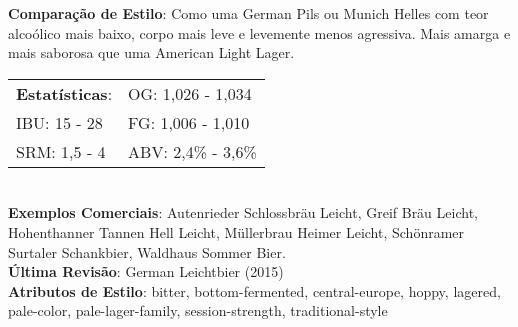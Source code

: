 \textbf{Comparação de Estilo}: Como uma German Pils ou Munich Helles com teor alcoólico mais baixo, corpo mais leve e levemente menos agressiva. Mais amarga e mais saborosa que uma American Light Lager. \\
\begin{tabular}{@{}p{35mm}p{35mm}@{}}
  \textbf{Estatísticas}: & OG: 1,026 - 1,034 \\
  IBU: 15 - 28  & FG: 1,006 - 1,010  \\
  SRM: 1,5 - 4  & ABV: 2,4\% - 3,6\%
\end{tabular}\\
\textbf{Exemplos Comerciais}: Autenrieder Schlossbräu Leicht, Greif Bräu Leicht, Hohenthanner Tannen Hell Leicht, Müllerbrau Heimer Leicht, Schönramer Surtaler Schankbier, Waldhaus Sommer Bier. \\
\textbf{Última Revisão}: German Leichtbier (2015) \\
\textbf{Atributos de Estilo}: bitter, bottom-fermented, central-europe, hoppy, lagered, pale-color, pale-lager-family, session-strength, traditional-style
